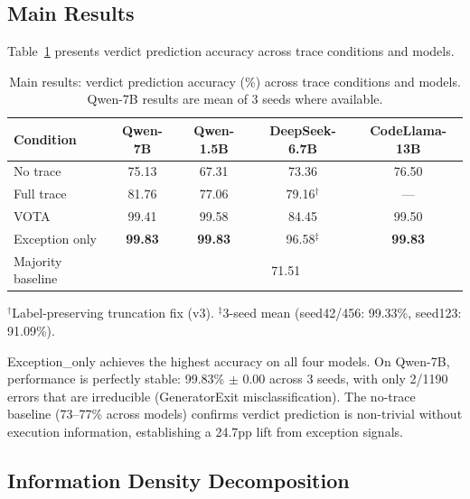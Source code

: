 \documentclass[11pt]{article}
\begin{document}
\subsection{Main Results}

Table~\ref{tab:main} presents verdict prediction accuracy across trace conditions and models.

\begin{table}[h]
\centering
\caption{Main results: verdict prediction accuracy (\%) across trace conditions and models. Qwen-7B results are mean of 3 seeds where available.}
\label{tab:main}
\small
\begin{tabular}{lcccc}
\toprule
\textbf{Condition} & \textbf{Qwen-7B} & \textbf{Qwen-1.5B} & \textbf{DeepSeek-6.7B} & \textbf{CodeLlama-13B} \\
\midrule
No trace & 75.13 & 67.31 & 73.36 & 76.50 \\
Full trace & 81.76 & 77.06 & 79.16$^\dagger$ & --- \\
VOTA & 99.41 & 99.58 & 84.45 & 99.50 \\
Exception only & \textbf{99.83} & \textbf{99.83} & 96.58$^\ddagger$ & \textbf{99.83} \\
\midrule
Majority baseline & \multicolumn{4}{c}{71.51} \\
\bottomrule
\end{tabular}
\vspace{2pt}

{\footnotesize $^\dagger$Label-preserving truncation fix (v3). $^\ddagger$3-seed mean (seed42/456: 99.33\%, seed123: 91.09\%).}
\end{table}

Exception\_only achieves the highest accuracy on all four models. On Qwen-7B, performance is perfectly stable: 99.83\% $\pm$ 0.00 across 3 seeds, with only 2/1190 errors that are irreducible (GeneratorExit misclassification). The no-trace baseline (73--77\% across models) confirms verdict prediction is non-trivial without execution information, establishing a 24.7pp lift from exception signals.

\subsection{Information Density Decomposition}
\end{document}
